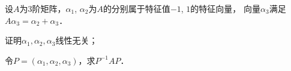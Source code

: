 \documentclass[plain,noanswer,medmath]{../../template/jnuexam}
\begin{document}


\begin{problem}[points=10]
设$A$为$3$阶矩阵，$\alpha_1$, $\alpha_2$为$A$的分别属于特征值$- 1$, $1$的特征向量，
向量$\alpha_3$满足$A\alpha_3 = \alpha_2 + \alpha_3$．\par
\begin{enumerate*}
\item 证明$\alpha_1,\alpha_2,\alpha_3$线性无关；
\item 令$P = \left(\alpha_1,\alpha_2,\alpha_3 \right)$，求$P^{-1} AP$．
\end{enumerate*}
\end{problem}
\end{document}
